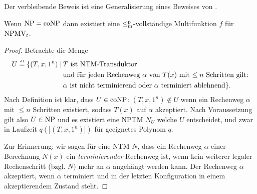 Der verbleibende Beweis ist eine Generalisierung eines Beweises von \textcite{dingel_separation_2022}.
\begin{theorem}\label{thm:npmvt-vs-npconp}
    Wenn $\mathrm{NP}=\mathrm{coNP}$ dann existiert eine $\leq_\mathrm{m}^\mathrm{p}$-vollständige Multifunktion $f$ für $\mathrm{NPMV}_t$.
\end{theorem}
\begin{proof}
    Betrachte die Menge
\[ \begin{split} U \stackrel{\text{{\normalfont\tiny df}}}{=}  \{ (T, x, 1^n) \mid \,&\text{$T$ ist NTM-Transduktor} \\ &\text{und für jeden Rechenweg $\alpha$ von $T(x)$ mit $\leq n$ Schritten gilt:} \\& \text{$\alpha$ ist nicht terminierend oder $\alpha$ terminiert ablehnend} \}. \end{split}  \]
    Nach Definition ist klar, dass $U\in\mathrm{coNP}$: $(T, x, 1^n)\not\in U$ wenn ein Rechenweg $\alpha$ mit $\leq n$ Schritten existiert, sodass $T(x)$ auf $\alpha$ akzeptiert. Nach Voraussetzung gilt also $U\in\mathrm{NP}$ und es existiert eine NPTM $N_U$ welche $U$ entscheidet, und zwar in Laufzeit $q(|(T, x, 1^n)|)$ für geeignetes Polynom $q$.

    Zur Erinnerung: wir sagen für eine NTM $N$, dass ein Rechenweg $\alpha$ einer Berechnung $N(x)$ ein \emph{terminierender} Rechenweg ist, wenn kein weiterer legaler Rechenschritt (bzgl. $N$) mehr an $\alpha$ angehängt werden kann. Der Rechenweg $\alpha$ akzeptiert, wenn $\alpha$ terminiert und in der letzten Konfiguration in einem akzeptierendem Zustand steht.


\end{proof}
